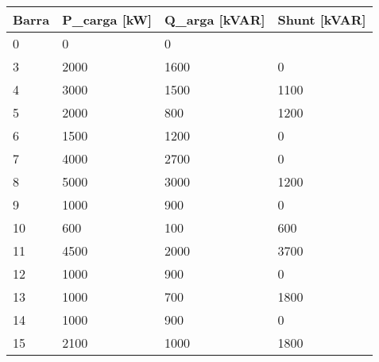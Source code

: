 \begin{tabular}{llll}
\toprule
\textbf{Barra}&\textbf{P_{carga} [kW]}&\textbf{Q_{arga} [kVAR]}&\textbf{Shunt [kVAR]}\\
\midrule
0&0&0\\
3&2000&1600&0\\
4&3000&1500&1100\\
5&2000&800&1200\\
6&1500&1200&0\\
7&4000&2700&0\\
8&5000&3000&1200\\
9&1000&900&0\\
10&600&100&600\\
11&4500&2000&3700\\
12&1000&900&0\\
13&1000&700&1800\\
14&1000&900&0\\
15&2100&1000&1800\\
\bottomrule
\end{tabular}
